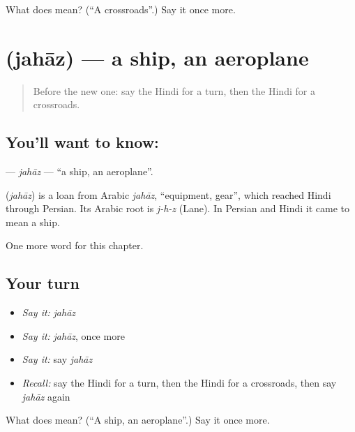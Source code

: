 \begin{tcolorbox}[breakable,colback=teal!4,colframe=teal!35!black,title={Before you move on}]
What does  mean? (\textquotedblleft{}A crossroads\textquotedblright{}.) Say it once more.
\end{tcolorbox}
\section[\texorpdfstring{\hi{जहाज़} (jahāz)}{जहाज़ (jahāz)}]{ (jahāz) — a ship, an aeroplane}

\label{lesson:HI-C181-jahaz}



\begin{quote}
Before the new one: say the Hindi for a turn, then the Hindi for a crossroads.
\end{quote}

\subsection*{You'll want to know: }
\textbf{} — \emph{jahāz} — \textquotedblleft{}a ship, an aeroplane\textquotedblright{}.

\begin{cousinweb}
\textbf{} (\emph{jahāz}) is a loan from Arabic \emph{jahāz}, \textquotedblleft{}equipment, gear\textquotedblright{}, which reached Hindi through Persian. Its Arabic root is \emph{j-h-z} (Lane). In Persian and Hindi it came to mean a ship.
\end{cousinweb}

\begin{grammarlens}[title={What you've built}]
One more word for this chapter.
\end{grammarlens}

\subsection*{Your turn}
\begin{itemize}
\raggedright
  \item \emph{Say it:} \emph{jahāz}
  \item \emph{Say it:} \emph{jahāz}, once more
  \item \emph{Say it:} say \emph{jahāz}
  \item \emph{Recall:} say the Hindi for a turn, then the Hindi for a crossroads, then say \emph{jahāz} again
\end{itemize}

\begin{tcolorbox}[breakable,colback=teal!4,colframe=teal!35!black,title={Before you move on}]
What does  mean? (\textquotedblleft{}A ship, an aeroplane\textquotedblright{}.) Say it once more.
\end{tcolorbox}
